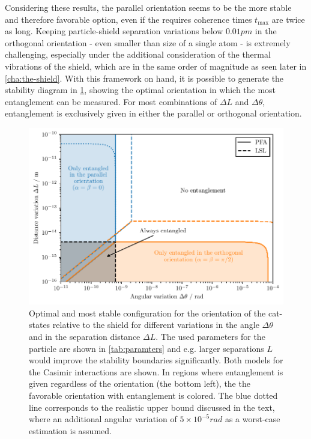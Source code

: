 Considering these results, the parallel orientation seems to be the more stable and therefore favorable option, even if the requires coherence times $t_\mathrm{max}$ are twice as long.
Keeping particle-shield separation variations below $0.01\si{pm}$ in the orthogonal orientation - even smaller than size of a single atom - is extremely challenging,  
especially under the additional consideration of the thermal vibrations of the shield, which are in the same order of magnitude as seen later in \cref{cha:the-shield}.
With this framework on hand, it is possible to generate the stability diagram in \cref{fig:4:optimal-orientation}, showing the optimal orientation in which the most entanglement can be measured.
For most combinations of $\Delta L$ and $\Delta \theta$, entanglement is exclusively given in either the parallel or orthogonal orientation.
\begin{figure}[!htbp]
  \centering
  \includegraphics[width=\textwidth]{./../figures/optimize/optimized-orientation-advanced.pdf}
  \caption{Optimal and most stable configuration for the orientation of the cat-states relative to the shield for different variations in the angle $\Delta \theta$ and in the separation distance $\Delta L$. The used parameters for the particle are shown in \cref{tab:paramters} and e.g. larger separations $L$ would improve the stability boundaries significantly. Both models for the Casimir interactions are shown. In regions where entanglement is given regardless of the orientation (the bottom left), the the favorable orientation with  entanglement is colored. The blue dotted line corresponds to the realistic upper bound discussed in the text, where an additional angular variation of $5 \times 10^{-5}\si{rad}$ as a worst-case estimation is assumed.}
  \label{fig:4:optimal-orientation}
\end{figure}



